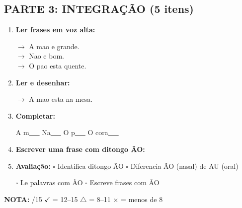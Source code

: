 \begin{exercicio}
\subsection*{PARTE 3: INTEGRAÇÃO (5 itens)}

\begin{enumerate}[resume]
  \item \textbf{Ler frases em voz alta:}
  \begin{center}
  $\rightarrow$ A mao e grande.\\
  $\rightarrow$ Nao e bom.\\
  $\rightarrow$ O pao esta quente.
  \end{center}

  \item \textbf{Ler e desenhar:}
  \begin{center}
  $\rightarrow$ A mao esta na mesa.
  \end{center}
  \begin{center}
  \end{center}

  \item \textbf{Completar:}
  \begin{center}
  A m\underline{~~~} \quad Na\underline{~~~} \quad O p\underline{~~~} \quad O cora\underline{~~~}
  \end{center}

  \item \textbf{Escrever uma frase com ditongo \~AO:}
  \begin{center}
  \underline{\hspace{12cm}}
  \end{center}

  \item \textbf{Avaliação:} $\square$ Identifica ditongo \~AO \quad $\square$ Diferencia \~AO (nasal) de AU (oral)
  \begin{center}
  $\square$ Le palavras com \~AO \quad $\square$ Escreve frases com \~AO
  \end{center}
\end{enumerate}

\noindent\textbf{NOTA:} \underline{\hspace{1cm}}/15 \quad $\checkmark$ = 12--15 \quad $\triangle$ = 8--11 \quad $\times$ = menos de 8
\end{exercicio}

